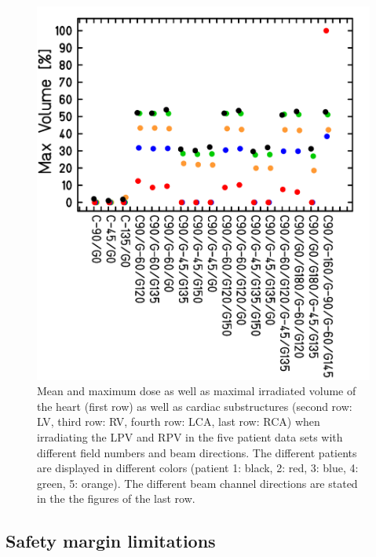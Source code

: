 \begin{figure}[H]
\begin{minipage}{0.31\textwidth}
  \includegraphics[width=\textwidth]{./teile/results_human/Mayo_Human_BeamDirection_RCA_MaxVolume.png}
\end{minipage}

  \caption{Mean and maximum dose as well as maximal irradiated volume of the heart (first row) as well as cardiac substructures (second row: 
  LV, third row: RV, fourth row: LCA, last row: RCA) when irradiating the LPV and RPV in the five patient data sets with different field 
  numbers and beam directions. The different patients are displayed in different colors (patient 1: black, 2: red, 3: blue, 4: green, 5: 
  orange). The different beam channel directions are stated in the the figures of the last row.}
  \label{beamdirection_MeanMaxD_MaxV}
  
\end{figure}

\newpage

\subsection{Safety margin limitations}
\label{safetymarginlimitation}

